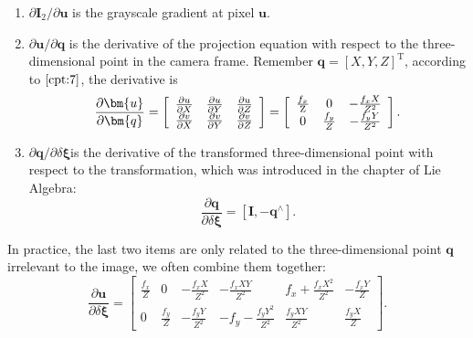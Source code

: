 {\begin{enumerate}
	\item $ \partial \bm{I}_2 / \partial \bm{u} $ is the grayscale gradient at pixel $\bm{u}$.
	\item $ \partial \bm{u} / \partial \bm{q} $ is the derivative of the projection equation with respect to the three-dimensional point in the camera frame. Remember $\bm{q}=[X,Y,Z]^\mathrm{T}$, according to $\ref{cpt:7}$, the derivative is
	\begin{equation}
	\frac{{\partial \bm{u}}}{{\partial \bm{q}}} = \left[ {\begin{array}{*{20}{c}}
		{\frac{{\partial u}}{{\partial X}}}&{\frac{{\partial u}}{{\partial Y}}}&{\frac{{\partial u}}{{\partial Z}}}\\
		{\frac{{\partial v}}{{\partial X}}}&{\frac{{\partial v}}{{\partial Y}}}&{\frac{{\partial v}}{{\partial Z}}}
		\end{array}} \right] = \left[ {\begin{array}{*{20}{c}}
		{\frac{{{f_x}}}{{\rm{Z}}}}&0&{ - \frac{{{f_x}X}}{{{Z^2}}}}\\
		0&{\frac{{{f_y}}}{Z}}&{ - \frac{{{f_y}Y}}{{{Z^2}}}}
		\end{array}} \right].
	\end{equation}
	
	\item ${\partial \bm{q}}/{\partial \delta \bm{\xi} }$is the derivative of the transformed three-dimensional point with respect to the transformation, which was introduced in the chapter of Lie Algebra:
	\begin{equation}
	\frac{{\partial \bm{q}}}{{\partial \delta \bm{\xi} }} = \left[ { \bm{I}, - {\bm{q}^ \wedge }} \right].
	\end{equation}
\end{enumerate}

In practice, the last two items are only related to the three-dimensional point $\bm{q}$ irrelevant to the image, we often combine them together:
\begin{equation}
\frac{{\partial \bm{u}}}{{\partial \delta \bm{\xi} }} = \left[ {\begin{array}{*{20}{c}}
	{\frac{{{f_x}}}{Z}}&0&{ - \frac{{{f_x}X}}{{{Z^2}}}}&{ - \frac{{{f_x}XY}}{{{Z^2}}}}&{{f_x} + \frac{{{f_x}{X^2}}}{{{Z^2}}}}&{ - \frac{{{f_x}Y}}{Z}}\\
	0&{\frac{{{f_y}}}{Z}}&{ - \frac{{{f_y}Y}}{{{Z^2}}}}&{ - {f_y} - \frac{{{f_y}{Y^2}}}{{{Z^2}}}}&{\frac{{{f_y}XY}}{{{Z^2}}}}&{\frac{{{f_y}X}}{Z}}
	\end{array}} \right].
\end{equation}

}
